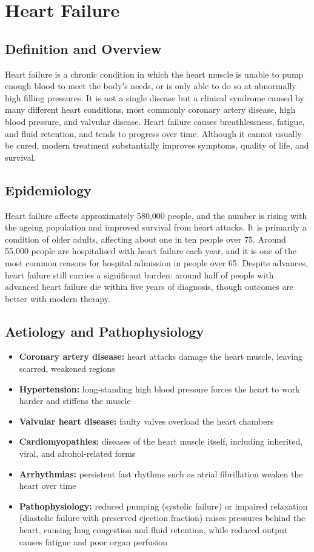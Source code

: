 \chapter{Heart Failure}

\section*{Definition and Overview}
Heart failure is a chronic condition in which the heart muscle is unable to pump enough blood to meet the body's needs, or is only able to do so at abnormally high filling pressures. It is not a single disease but a clinical syndrome caused by many different heart conditions, most commonly coronary artery disease, high blood pressure, and valvular disease. Heart failure causes breathlessness, fatigue, and fluid retention, and tends to progress over time. Although it cannot usually be cured, modern treatment substantially improves symptoms, quality of life, and survival.

\section*{Epidemiology}
Heart failure affects approximately 580,000 people, and the number is rising with the ageing population and improved survival from heart attacks. It is primarily a condition of older adults, affecting about one in ten people over 75. Around 55,000 people are hospitalised with heart failure each year, and it is one of the most common reasons for hospital admission in people over 65. Despite advances, heart failure still carries a significant burden: around half of people with advanced heart failure die within five years of diagnosis, though outcomes are better with modern therapy.

\section*{Aetiology and Pathophysiology}
\begin{itemize}
    \item \textbf{Coronary artery disease:} heart attacks damage the heart muscle, leaving scarred, weakened regions
    \item \textbf{Hypertension:} long-standing high blood pressure forces the heart to work harder and stiffens the muscle
    \item \textbf{Valvular heart disease:} faulty valves overload the heart chambers
    \item \textbf{Cardiomyopathies:} diseases of the heart muscle itself, including inherited, viral, and alcohol-related forms
    \item \textbf{Arrhythmias:} persistent fast rhythms such as atrial fibrillation weaken the heart over time
    \item \textbf{Pathophysiology:} reduced pumping (systolic failure) or impaired relaxation (diastolic failure with preserved ejection fraction) raises pressures behind the heart, causing lung congestion and fluid retention, while reduced output causes fatigue and poor organ perfusion
\end{itemize}

